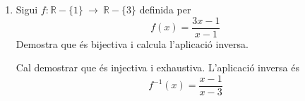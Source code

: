 \begin{enumerate}
\begin{indicacio}
(a) $f(A)=[3,7]$ i $f^{-1}(A)=[0,1]$, (b) $f(A)=[-3,-1)$ i $
f^{-1}(A)=[-3/2,-1)$, (c) $f(A)=[3,+\infty )$ i $f^{-1}(A)=[0,+\infty )$ i
(d) $f(A)=(-\infty ,-3)$ i $f^{-1}(A)=(-\infty ,-3/2)$.
\end{indicacio}

\item
\begin{exercici}
Sigui $f:\mathbb{R}-\{1\}~\longrightarrow ~\mathbb{R}-\{3\}$ definida
per%
\begin{equation*}
f(x)=\frac{3x-1}{x-1}
\end{equation*}%
Demostra que és bijectiva i calcula l'aplicació inversa.
\end{exercici}

\begin{indicacio}
Cal demostrar que és injectiva i exhaustiva. L'aplicació
inversa és%
\begin{equation*}
f^{-1}(x)=\frac{x-1}{x-3}
\end{equation*}
\end{indicacio}
\end{enumerate}
